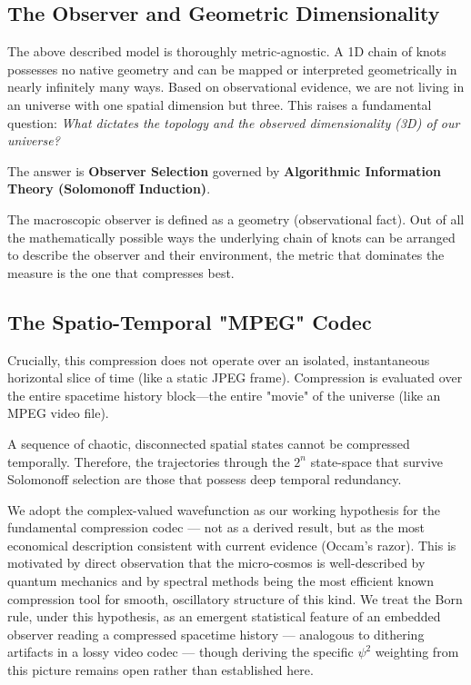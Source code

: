 \subsection{The Observer and Geometric Dimensionality}

The above described model is thoroughly metric-agnostic.
A 1D chain of knots possesses no native geometry and can be mapped or interpreted geometrically in nearly infinitely many ways.
Based on observational evidence, we are not living in an universe with one spatial dimension but three.
This raises a fundamental question: \textit{What dictates the topology and the observed dimensionality (3D) of our universe?}

The answer is \textbf{Observer Selection} governed by \textbf{Algorithmic Information Theory (Solomonoff Induction)}.

The macroscopic observer is defined as a geometry (observational fact). Out of all the mathematically possible ways the underlying chain of knots can be arranged to describe the observer and their environment, the metric that dominates the measure is the one that compresses best.

\subsection{The Spatio-Temporal "MPEG" Codec}

Crucially, this compression does not operate over an isolated, instantaneous horizontal slice of time (like a static JPEG frame). Compression is evaluated over the entire spacetime history block—the entire "movie" of the universe (like an MPEG video file).

A sequence of chaotic, disconnected spatial states cannot be compressed temporally. Therefore, the trajectories through the $2^n$ state-space that survive Solomonoff selection are those that possess deep temporal redundancy.

We adopt the complex-valued wavefunction as our working hypothesis for the fundamental compression codec — not as a derived result, but as the most economical description consistent with current evidence (Occam's razor).
This is motivated by direct observation that the micro-cosmos is well-described by quantum mechanics and by spectral methods being the most efficient known compression tool for smooth, oscillatory structure of this kind.
We treat the Born rule, under this hypothesis, as an emergent statistical feature of an embedded observer reading a compressed spacetime history — analogous to dithering artifacts in a lossy
video codec — though deriving the specific $\psi^2$ weighting from this picture remains open rather than established here.


